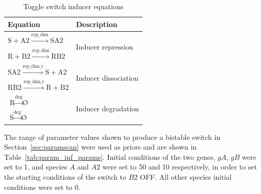 \begin{table}[htbp]
\centering
\caption{Toggle switch inducer equations}
\label{tab:toglle-inducer-equs}
\begin{tabular}{@{}ll@{}}
\toprule
Equation                                                                                & Description                           \\ \midrule
$\textrm{S} + \textrm{A2} \stackrel{\textrm{rep\_dim}}{\longrightarrow}\textrm{SA2}$    & \multirow{2}{*}{Inducer repression}   \\
$\textrm{R} + \textrm{B2} \stackrel{\textrm{rep\_dim}}{\longrightarrow}\textrm{RB2}$    &                                       \\
$\textrm{SA2} \stackrel{\textrm{rep\_dim\_r}}{\longrightarrow}\textrm{S} + \textrm{A2}$ & \multirow{2}{*}{Inducer dissociation} \\
$\textrm{RB2} \stackrel{\textrm{rep\_dim\_r}}{\longrightarrow}\textrm{R} + \textrm{B2}$ &                                       \\
$\textrm{R} \stackrel{\textrm{deg}}{\longrightarrow} \textrm{\O}$                       & \multirow{2}{*}{Inducer degradation}  \\
$\textrm{S} \stackrel{\textrm{deg}}{\longrightarrow}\textrm{\O}$                        &                                       \\ \cmidrule(r){1-2}
\end{tabular}
\end{table}
The range of parameter values shown to produce a bistable switch in Section~\ref{sec:paramscan} were used as priors and are shown in Table~\ref{tab:param_inf_params}. Initial conditions of the two genes, $gA$, $gB$ were set to 1, and species $A$ and $A2$ were set to 50 and 10 respectively, in order to set the starting conditions of the switch to $B2$ OFF. All other species initial conditions were set to 0. 

